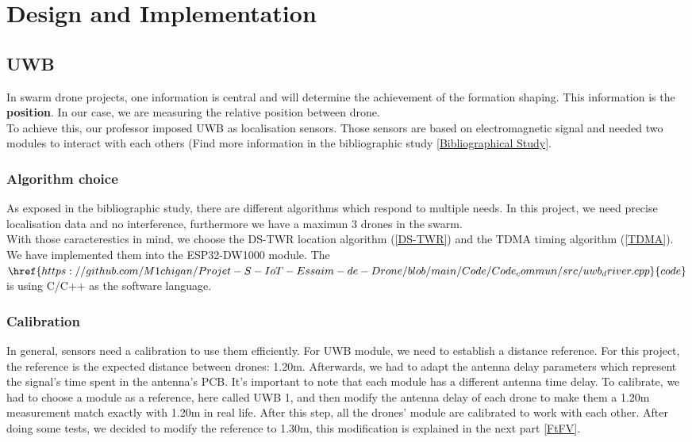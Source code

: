 \chapter{Design and Implementation}

\section{UWB}
In swarm drone projects, one information is central and will determine the achievement of the formation shaping.
This information is the \textbf{position}. In our case, we are measuring the relative position between drone. \\ 
To achieve this, our professor imposed UWB as localisation sensors. Those sensors are based on electromagnetic signal and needed two modules to interact with each others (Find more information in the bibliographic study \ref{Bibliographical Study}.

\subsection{Algorithm choice}
As exposed in the bibliographic study, there are different algorithms which respond to multiple needs. In this project, we need precise localisation data and no interference, furthermore we have a maximun 3 drones in the swarm. \\
With those caracterestics in mind, we choose the DS-TWR location algorithm (\ref{DS-TWR}) and the TDMA timing algorithm (\ref{TDMA}). \\
We have implemented them into the ESP32-DW1000 module. The $\href{https://github.com/M1chigan/Projet-S-IoT-Essaim-de-Drone/blob/main/Code/Code_commun/src/uwb_driver.cpp}{code}$ is using C/C++ as the software language. 

\subsection{Calibration}

In general, sensors need a calibration to use them efficiently. For UWB module, we need to establish a distance reference. For this project, the reference is the expected distance between drones: 1.20m. Afterwards, we had to adapt the antenna delay parameters which represent the signal's time spent in the antenna's PCB. It's important to note that each module has a different antenna time delay. To calibrate, we had to choose a module as a reference, here called UWB 1, and then modify the antenna delay of each drone to make them a 1.20m measurement match exactly with 1.20m in real life. After this step, all the drones' module are calibrated to work with each other. After doing some tests, we decided to modify the reference to 1.30m, this modification is explained in the next part \ref{FtFV}.
\newpage
